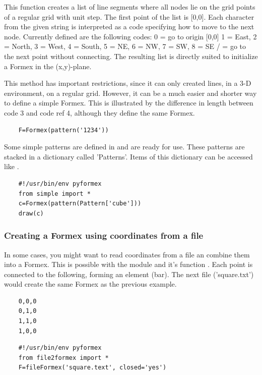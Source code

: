 \documentclass[a4paper]{manual}
\begin{document}
{%
    This function creates a list of line segments where all nodes lie on the
    grid points of a regular grid with unit step.
    The first point of the list is [0,0]. Each character from the given
    string is interpreted as a code specifying how to move to the next node.
    Currently defined are the following codes:
    0 = go to origin [0,0]
    1 = East, 2 = North, 3 = West, 4 = South, 5 = NE, 6 = NW, 7 = SW, 8 = SE
    / = go to the next point without connecting.
    The resulting list is directly suited to initialize a Formex in the
    (x,y)-plane.

This method has important restrictions, since it can only created lines, in a 3-D environment, on a regular grid. However, it can be a much easier and shorter way to define a simple Formex. This is illustrated by the difference in length between code 3 and code ref 4, although they define the same Formex.%
\begin{verbatim}
	F=Formex(pattern('1234'))
\end{verbatim}

Some simple patterns are defined in  and are ready for use. These patterns are stacked in a dictionary called 'Patterns'. Items of this dictionary can be accessed like .
\begin{verbatim}
	#!/usr/bin/env pyformex
	from simple import *
	c=Formex(pattern(Pattern['cube']))
	draw(c)
\end{verbatim}

\subsubsection{Creating a Formex using coordinates from a file}
In some cases, you might want to read coordinates from a file an combine them into a Formex. This is possible with the module  and it's function . Each point is connected to the following, forming an element (bar).
The next file ('square.txt') would create the same Formex as the previous example. %
\begin{verbatim}
	0,0,0
	0,1,0
	1,1,0
	1,0,0
\end{verbatim}
\begin{verbatim}
	#!/usr/bin/env pyformex
	from file2formex import *
	F=fileFormex('square.text', closed='yes')
\end{verbatim}

}
\end{document}

